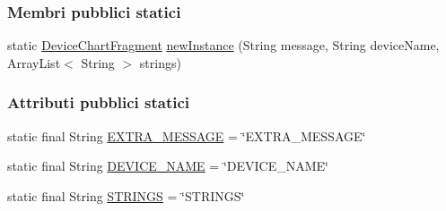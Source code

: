 \subsubsection*{Membri pubblici statici}
\begin{DoxyCompactItemize}
\item 
static \hyperlink{classit_1_1unibo_1_1torsello_1_1bluetoothpositioning_1_1fragment_1_1devicesObservers_1_1DeviceChartFragment}{Device\+Chart\+Fragment} \hyperlink{classit_1_1unibo_1_1torsello_1_1bluetoothpositioning_1_1fragment_1_1devicesObservers_1_1DeviceChartFragment_ac3a29d125bf39a859054cca378274185_ac3a29d125bf39a859054cca378274185}{new\+Instance} (String message, String device\+Name, Array\+List$<$ String $>$ strings)
\end{DoxyCompactItemize}
\subsubsection*{Attributi pubblici statici}
\begin{DoxyCompactItemize}
\item 
static final String \hyperlink{classit_1_1unibo_1_1torsello_1_1bluetoothpositioning_1_1fragment_1_1devicesObservers_1_1DeviceChartFragment_a07b2f252088c2cf0af46ea39ae83bc09_a07b2f252088c2cf0af46ea39ae83bc09}{E\+X\+T\+R\+A\+\_\+\+M\+E\+S\+S\+A\+GE} = \char`\"{}E\+X\+T\+R\+A\+\_\+\+M\+E\+S\+S\+A\+GE\char`\"{}
\item 
static final String \hyperlink{classit_1_1unibo_1_1torsello_1_1bluetoothpositioning_1_1fragment_1_1devicesObservers_1_1DeviceChartFragment_a5f778eb494a70b25d52ea96e85342011_a5f778eb494a70b25d52ea96e85342011}{D\+E\+V\+I\+C\+E\+\_\+\+N\+A\+ME} = \char`\"{}D\+E\+V\+I\+C\+E\+\_\+\+N\+A\+ME\char`\"{}
\item 
static final String \hyperlink{classit_1_1unibo_1_1torsello_1_1bluetoothpositioning_1_1fragment_1_1devicesObservers_1_1DeviceChartFragment_a343835bbfb305e22881397c1b9249b00_a343835bbfb305e22881397c1b9249b00}{S\+T\+R\+I\+N\+GS} = \char`\"{}S\+T\+R\+I\+N\+GS\char`\"{}
\end{DoxyCompactItemize}
